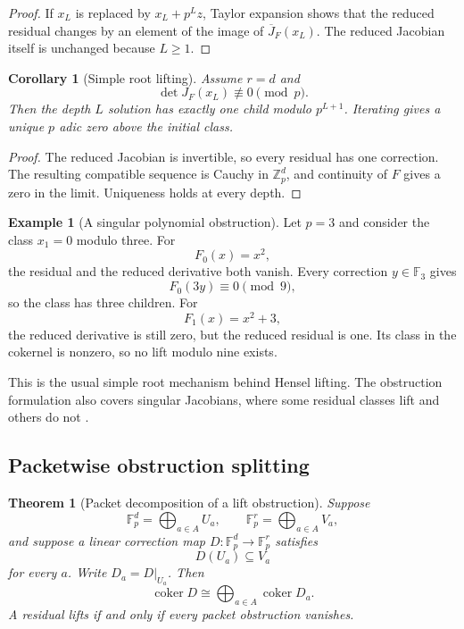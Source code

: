 \documentclass{aomart}
\newtheorem{theorem}{Theorem}[section]
\newtheorem{corollary}[corollary]{Corollary}
\theoremstyle{definition}
\newtheorem{example}[example]{Example}
\theoremstyle{remark}
\newcommand{\FF}{\mathbb F}
\newcommand{\Zp}{\mathbb Z_p}
\newcommand{\coker}{\operatorname{coker}}
\begin{document}
\begin{proof}
If \(x_L\) is replaced by \(x_L+p^Lz\), Taylor expansion shows that the reduced residual changes by an element of the image of \(\overline J_F(x_L)\). The reduced Jacobian itself is unchanged because \(L\geq1\).
\end{proof}

\begin{corollary}[Simple root lifting]\label{cor:simple_root_lifting}
Assume \(r=d\) and
\[
\det J_F(x_L)\not\equiv0\pmod p.
\]
Then the depth \(L\) solution has exactly one child modulo \(p^{L+1}\). Iterating gives a unique \(p\) adic zero above the initial class.
\end{corollary}

\begin{proof}
The reduced Jacobian is invertible, so every residual has one correction. The resulting compatible sequence is Cauchy in \(\Zp^d\), and continuity of \(F\) gives a zero in the limit. Uniqueness holds at every depth.
\end{proof}

\begin{example}[A singular polynomial obstruction]\label{ex:singular_polynomial_obstruction}
Let \(p=3\) and consider the class \(x_1=0\) modulo three. For
\[
F_0(x)=x^2,
\]
the residual and the reduced derivative both vanish. Every correction \(y\in\FF_3\) gives
\[
F_0(3y)\equiv0\pmod9,
\]
so the class has three children. For
\[
F_1(x)=x^2+3,
\]
the reduced derivative is still zero, but the reduced residual is one. Its class in the cokernel is nonzero, so no lift modulo nine exists.
\end{example}

This is the usual simple root mechanism behind Hensel lifting. The obstruction formulation also covers singular Jacobians, where some residual classes lift and others do not \cite{Serre1979,Gouvea1997,Robert2000}.

\subsection{Packetwise obstruction splitting}

\begin{theorem}[Packet decomposition of a lift obstruction]\label{thm:packet_lift_obstruction}
Suppose
\[
\FF_p^d
=
\bigoplus_{a\in A}U_a,
\qquad
\FF_p^r
=
\bigoplus_{a\in A}V_a,
\]
and suppose a linear correction map \(D:\FF_p^d\to\FF_p^r\) satisfies
\[
D(U_a)\subseteq V_a
\]
for every \(a\). Write \(D_a=D|_{U_a}\). Then
\[
\boxed{
\coker D
\cong
\bigoplus_{a\in A}\coker D_a.
}
\]
A residual lifts if and only if every packet obstruction vanishes.
\end{theorem}
\end{document}
